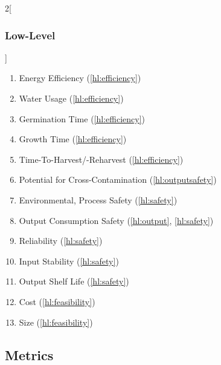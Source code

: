 \documentclass{../tex/report}
\begin{document}
\begin{multicols}{2}[\subsubsection{Low-Level}\label{sec:llos}]
\begin{enumerate}[label=LL\arabic*., ref=LL\arabic*]
        \item \label{ll:efficiency_energy} Energy Efficiency                    \hfill (\ref{hl:efficiency})
        \item \label{ll:efficiency_water} Water Usage                           \hfill (\ref{hl:efficiency})
        \item \label{ll:time_germination} Germination Time                      \hfill (\ref{hl:efficiency})
        \item \label{ll:time_growth} Growth Time                                \hfill (\ref{hl:efficiency})
        \item \label{ll:time_harvest} Time-To-Harvest/-Reharvest                \hfill (\ref{hl:efficiency})
        \item \label{ll:crosscontamination} Potential for Cross-Contamination   \hfill (\ref{hl:outputsafety})
        \item \label{ll:safety_process} Environmental, Process Safety           \hfill (\ref{hl:safety})
        \item \label{ll:output_safety} Output Consumption Safety                \hfill (\ref{hl:output}, \ref{hl:safety})
        \item \label{ll:reliability} Reliability                                \hfill (\ref{hl:safety})
        \item \label{ll:stability_input} Input Stability                        \hfill (\ref{hl:safety})
        \item \label{ll:stability_output} Output Shelf Life                     \hfill (\ref{hl:safety})
        \item \label{ll:cost} Cost                                              \hfill (\ref{hl:feasibility})
        \item \label{ll:size} Size                                              \hfill (\ref{hl:feasibility})
    \end{enumerate}
\end{multicols}

\clearpage
\subsection{Metrics}
\label{sec:metrics}
\end{document}
